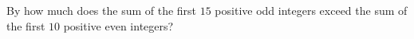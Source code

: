By how much does the sum of the first $15$ positive odd integers exceed the sum of the first $10$ positive even integers?
